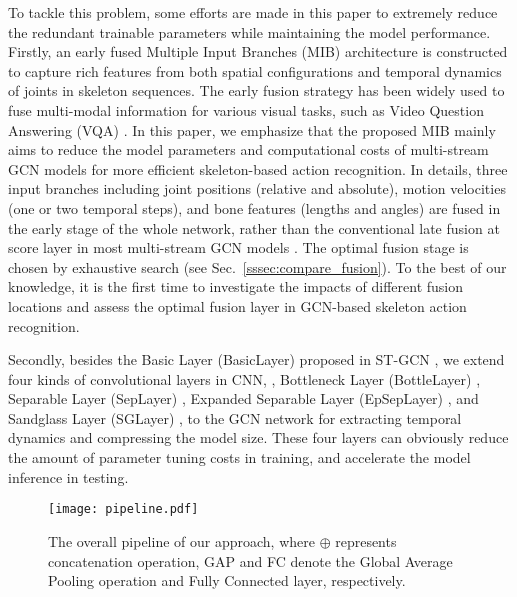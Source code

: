 \documentclass[10pt,journal,compsoc]{IEEEtran}
\begin{document}
To tackle this problem, some efforts are made in this paper to extremely reduce the redundant trainable parameters while maintaining the model performance. Firstly, an early fused Multiple Input Branches (MIB) architecture is constructed to capture rich features from both spatial configurations and temporal dynamics of joints in skeleton sequences. The early fusion strategy has been widely used to fuse multi-modal information for various visual tasks, such as Video Question Answering (VQA) \cite{huang2020location}. In this paper, we emphasize that the proposed MIB mainly aims to reduce the model parameters and computational costs of multi-stream GCN models for more efficient skeleton-based action recognition. In details, three input branches including joint positions (relative and absolute), motion velocities (one or two temporal steps), and bone features (lengths and angles) are fused in the early stage of the whole network, rather than the conventional late fusion at score layer in most multi-stream GCN models \cite{shi2019two,liu2020disentangling,chen2021multi}. The optimal fusion stage is chosen by exhaustive search (see Sec.~\ref{sssec:compare_fusion}). To the best of our knowledge, it is the first time to investigate the impacts of different fusion locations and assess the optimal fusion layer in GCN-based skeleton action recognition.

Secondly, besides the Basic Layer (BasicLayer) proposed in ST-GCN \cite{yan2018spatial}, we extend four kinds of convolutional layers in CNN, \ie, Bottleneck Layer (BottleLayer) \cite{he2016deep}, Separable Layer (SepLayer) \cite{howard2017mobilenets}, Expanded Separable Layer (EpSepLayer) \cite{sandler2018mobilenetv2}, and Sandglass Layer (SGLayer) \cite{zhou2020rethinking}, to the GCN network for extracting temporal dynamics and compressing the model size. These four layers can obviously reduce the amount of parameter tuning costs in training, and accelerate the model inference in testing.

\begin{figure}[t]
  \centerline{\texttt{[image: pipeline.pdf]}}
  \vspace{-0.4cm}
  \caption{The overall pipeline of our approach, where $\oplus$ represents concatenation operation, GAP and FC denote the Global Average Pooling operation and Fully Connected layer, respectively. \bv}\label{fig:pipeline}
  \vspace{-0.4cm}
\end{figure}
\end{document}
